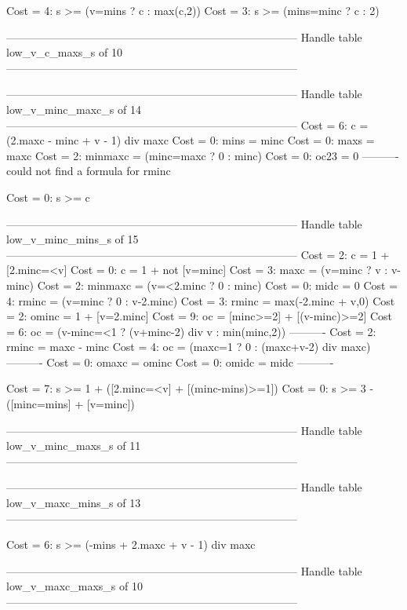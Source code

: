 Cost =  4:  s >= (v=mins ? c : max(c,2))
Cost =  3:  s >= (mins=minc ? c : 2)

--------------------------------------------------------------------------------
Handle table low_v_c_maxs_s of 10
--------------------------------------------------------------------------------


--------------------------------------------------------------------------------
Handle table low_v_minc_maxc_s of 14
--------------------------------------------------------------------------------
Cost =  6:  c       = (2.maxc - minc + v - 1) div maxc
Cost =  0:  mins    = minc
Cost =  0:  maxs    = maxc
Cost =  2:  minmaxc = (minc=maxc ? 0 : minc)
Cost =  0:  oc23    = 0
----------
could not find a formula for rminc

Cost =  0:  s >= c

--------------------------------------------------------------------------------
Handle table low_v_minc_mins_s of 15
--------------------------------------------------------------------------------
Cost =  2:  c       = 1 + [2.minc=<v]
Cost =  0:  c       = 1 + not [v=minc]
Cost =  3:  maxc    = (v=minc ? v : v-minc)
Cost =  2:  minmaxc = (v=<2.minc ? 0 : minc)
Cost =  0:  midc    = 0
Cost =  4:  rminc   = (v=minc ? 0 : v-2.minc)
Cost =  3:  rminc   = max(-2.minc + v,0)
Cost =  2:  ominc   = 1 + [v=2.minc]
Cost =  9:  oc      = [minc>=2] + [(v-minc)>=2]
Cost =  6:  oc      = (v-minc=<1 ? (v+minc-2) div v : min(minc,2))
----------
Cost =  2:  rminc   = maxc - minc
Cost =  4:  oc      = (maxc=1 ? 0 : (maxc+v-2) div maxc)
----------
Cost =  0:  omaxc   = ominc
Cost =  0:  omidc   = midc
----------

Cost =  7:  s >= 1 + ([2.minc=<v] + [(minc-mins)>=1])
Cost =  0:  s >= 3 - ([minc=mins] + [v=minc])

--------------------------------------------------------------------------------
Handle table low_v_minc_maxs_s of 11
--------------------------------------------------------------------------------


--------------------------------------------------------------------------------
Handle table low_v_maxc_mins_s of 13
--------------------------------------------------------------------------------

Cost =  6:  s >= (-mins + 2.maxc + v - 1) div maxc

--------------------------------------------------------------------------------
Handle table low_v_maxc_maxs_s of 10
--------------------------------------------------------------------------------


